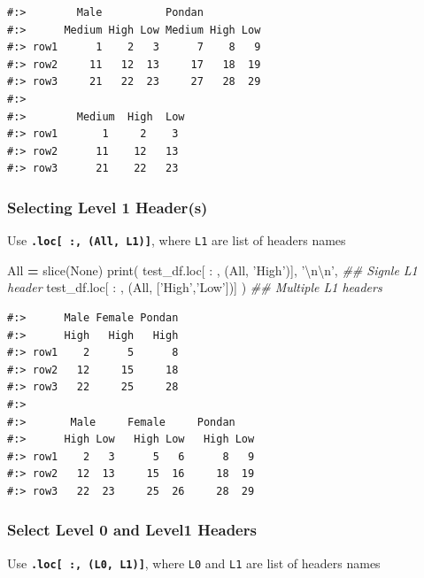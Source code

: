 \documentclass[
]{book}
\newenvironment{Shaded}{\begin{snugshade}}{\end{snugshade}}
\newcommand{\BuiltInTok}[1]{#1}
\newcommand{\CharTok}[1]{\textcolor[rgb]{0.5,0.5,0.5}{#1}}
\newcommand{\CommentTok}[1]{\textcolor[rgb]{0.37,0.37,0.37}{\textit{#1}}}
\newcommand{\NormalTok}[1]{#1}
\newcommand{\OperatorTok}[1]{\textcolor[rgb]{0.43,0.43,0.43}{\textbf{#1}}}
\newcommand{\StringTok}[1]{\textcolor[rgb]{0.5,0.5,0.5}{#1}}
\newcommand{\VariableTok}[1]{\textcolor[rgb]{0,0,0}{#1}}
\begin{document}
\begin{verbatim}
#:>        Male          Pondan         
#:>      Medium High Low Medium High Low
#:> row1      1    2   3      7    8   9
#:> row2     11   12  13     17   18  19
#:> row3     21   22  23     27   28  29 
#:> 
#:>        Medium  High  Low
#:> row1       1     2    3
#:> row2      11    12   13
#:> row3      21    22   23
\end{verbatim}

\hypertarget{selecting-level-1-headers}{%
\subsubsection{Selecting Level 1 Header(s)}\label{selecting-level-1-headers}}

Use \textbf{\texttt{.loc{[}\ :,\ (All,\ L1){]}}}, where \texttt{L1} are list of headers names

\begin{Shaded}
\begin{Highlighting}[]
\NormalTok{All }\OperatorTok{=} \BuiltInTok{slice}\NormalTok{(}\VariableTok{None}\NormalTok{)}
\BuiltInTok{print}\NormalTok{( test_df.loc[ : , (All, }\StringTok{'High'}\NormalTok{)],  }\StringTok{'}\CharTok{\textbackslash{}n\textbackslash{}n}\StringTok{'}\NormalTok{,  }\CommentTok{## Signle L1 header}
\NormalTok{       test_df.loc[ : , (All, [}\StringTok{'High'}\NormalTok{,}\StringTok{'Low'}\NormalTok{])] )  }\CommentTok{## Multiple L1 headers}
\end{Highlighting}
\end{Shaded}

\begin{verbatim}
#:>      Male Female Pondan
#:>      High   High   High
#:> row1    2      5      8
#:> row2   12     15     18
#:> row3   22     25     28 
#:> 
#:>       Male     Female     Pondan    
#:>      High Low   High Low   High Low
#:> row1    2   3      5   6      8   9
#:> row2   12  13     15  16     18  19
#:> row3   22  23     25  26     28  29
\end{verbatim}

\hypertarget{select-level-0-and-level1-headers}{%
\subsubsection{Select Level 0 and Level1 Headers}\label{select-level-0-and-level1-headers}}

Use \textbf{\texttt{.loc{[}\ :,\ (L0,\ L1){]}}}, where \texttt{L0} and \texttt{L1} are list of headers names
\end{document}
